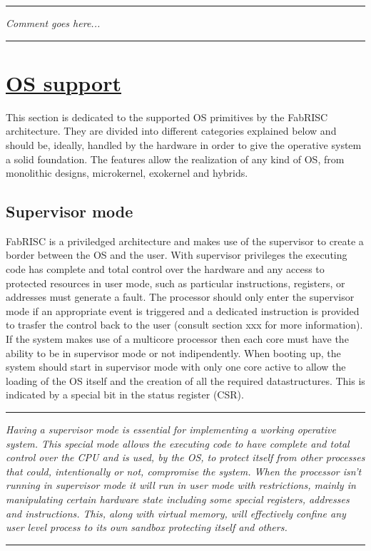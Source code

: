 \documentclass{article}
\begin{document}

        \par\noindent\rule{\textwidth}{0.4pt}
        \textit{Comment goes here...}
        \par\noindent\rule{\textwidth}{0.4pt}

    \clearpage

    \section[OS support]{\LARGE\underline{OS support}}

        This section is dedicated to the supported OS primitives by the FabRISC architecture. They are divided into different categories explained below and should be, ideally, handled by the hardware in order to give the operative system a solid foundation. The features allow the realization of any kind of OS, from monolithic designs, microkernel, exokernel and hybrids.

        \subsection{Supervisor mode}

            FabRISC is a priviledged architecture and makes use of the supervisor to create a border between the OS and the user. With supervisor privileges the executing code has complete and total control over the hardware and any access to protected resources in user mode, such as particular instructions, registers, or addresses must generate a fault. The processor should only enter the supervisor mode if an appropriate event is triggered and a dedicated instruction is provided to trasfer the control back to the user (consult section xxx for more information). If the system makes use of a multicore processor then each core must have the ability to be in supervisor mode or not indipendently. When booting up, the system should start in supervisor mode with only one core active to allow the loading of the OS itself and the creation of all the required datastructures. This is indicated by a special bit in the status register (CSR).

        \par\noindent\rule{\textwidth}{0.4pt}
        \textit{Having a supervisor mode is essential for implementing a working operative system. This special mode allows the executing code to have complete and total control over the CPU and is used, by the OS, to protect itself from other processes that could, intentionally or not, compromise the system. When the processor isn't running in supervisor mode it will run in user mode with restrictions, mainly in manipulating certain hardware state including some special registers, addresses and instructions. This, along with virtual memory, will effectively confine any user level process to its own sandbox protecting itself and others.}
        \par\noindent\rule{\textwidth}{0.4pt}
\end{document}
